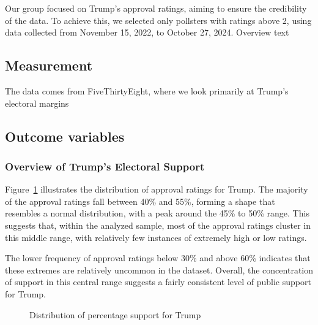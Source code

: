 \documentclass[
  letterpaper,
  DIV=11,
  numbers=noendperiod]{scrartcl}
\begin{document}
Our group focused on Trump's approval ratings, aiming to ensure the
credibility of the data. To achieve this, we selected only pollsters
with ratings above 2, using data collected from November 15, 2022, to
October 27, 2024. Overview text

\subsection{Measurement}\label{measurement}

The data comes from FiveThirtyEight, where we look primarily at Trump's
electoral margins

\subsection{Outcome variables}\label{outcome-variables}

\subsubsection{Overview of Trump's Electoral
Support}\label{overview-of-trumps-electoral-support}

Figure~\ref{fig-pct} illustrates the distribution of approval ratings
for Trump. The majority of the approval ratings fall between 40\% and
55\%, forming a shape that resembles a normal distribution, with a peak
around the 45\% to 50\% range. This suggests that, within the analyzed
sample, most of the approval ratings cluster in this middle range, with
relatively few instances of extremely high or low ratings.

The lower frequency of approval ratings below 30\% and above 60\%
indicates that these extremes are relatively uncommon in the dataset.
Overall, the concentration of support in this central range suggests a
fairly consistent level of public support for Trump.

\begin{figure}


\caption{\label{fig-pct}Distribution of percentage support for Trump}

\end{figure}%
\end{document}
